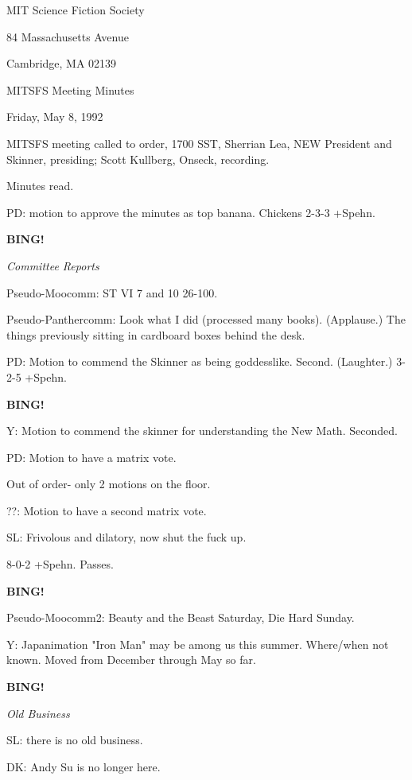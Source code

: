 \documentclass[12pt]{article}
\newcommand{\bing}{{\bf BING!} }
\newcommand{\goto}[1]{\bing \vskip 12pt \centerline{{\em{#1}}}}
\begin{document}
\begin{center}

MIT Science Fiction Society 

84 Massachusetts Avenue

Cambridge, MA 02139

\vspace{12pt}

MITSFS Meeting Minutes 

Friday, May 8, 1992

\end{center}
 
\vspace{18pt}

\setlength{\parskip}{6pt}

\noindent
MITSFS meeting called to order, 1700 SST,
Sherrian Lea, NEW President and Skinner, presiding; Scott Kullberg, Onseck, recording.

Minutes read.

PD: motion to approve the minutes as top banana. Chickens 2-3-3 +Spehn.

\goto{Committee Reports}

Pseudo-Moocomm: ST VI 7 and 10 26-100.

Pseudo-Panthercomm: Look what I did (processed many books). (Applause.) The things previously sitting in cardboard boxes behind the desk.

PD: Motion to commend the Skinner as being goddesslike. Second. (Laughter.) 3-2-5 +Spehn.

\bing

Y: Motion to commend the skinner for understanding the New Math. Seconded.

PD: Motion to have a matrix vote.

Out of order- only 2 motions on the floor.

??: Motion to have a second matrix vote.

SL: Frivolous and dilatory, now shut the fuck up.

8-0-2 +Spehn. Passes.

\bing

Pseudo-Moocomm2: Beauty and the Beast Saturday, Die Hard Sunday.

Y: Japanimation "Iron Man" may be among us this summer. Where/when not known. Moved from December through May so far.

\goto{Old Business}

SL: there is no old business.

DK: Andy Su is no longer here.
\end{document}
